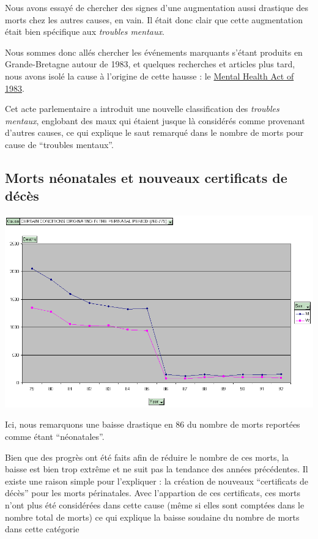     Nous avons essayé de chercher des signes d'une augmentation aussi drastique des morts chez les autres causes, en vain. Il était donc
    clair que cette augmentation était bien spécifique aux \textit{troubles mentaux}.

    Nous sommes donc allés chercher les événements marquants s'étant produits en Grande-Bretagne autour de 1983, et quelques recherches
    et articles plus tard, nous avons isolé la cause à l'origine de cette hausse : le \href{en.wikipedia.org/wiki/Mental_Health_Act_1983‎}{Mental Health Act of 1983}.

    Cet acte parlementaire a introduit une nouvelle classification des \textit{troubles mentaux}, englobant des maux qui étaient jusque là considérés
    comme provenant d'autres causes, ce qui explique le saut remarqué dans le nombre de morts pour cause de ``troubles mentaux''.

\subsection{Morts néonatales et nouveaux certificats de décès}

    \includegraphics[scale=0.5]{images/perinatal.png}

    Ici, nous remarquons une baisse drastique en 86 du nombre de morts reportées comme étant ``néonatales''.

    Bien que des progrès ont été faits afin de réduire le nombre de ces morts, la baisse est bien trop extrême et ne suit pas la tendance des années
    précédentes. Il existe une raison simple pour l'expliquer : la création de nouveaux ``certificats de décès'' pour les morts périnatales. Avec
    l'appartion de ces certificats, ces morts n'ont plus été considérées dans cette cause (même si elles sont comptées dans le nombre total de morts)
    ce qui explique la baisse soudaine du nombre de morts dans cette catégorie

